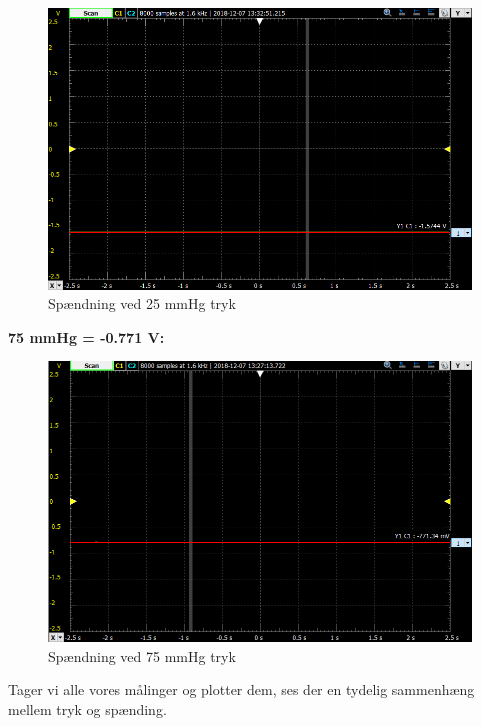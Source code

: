 \begin{figure}[h!]
	\centering
	\includegraphics[width=1\linewidth]{Hardwaredesign/mmHg25}
	\caption{Spændning ved 25 mmHg tryk}
	\label{fig:mmHg25}
\end{figure}

\vspace{0.2 cm}

\textbf{75 mmHg  =  -0.771 V:}

\vspace{0.2 cm}

\begin{figure}[h!]
	\centering
	\includegraphics[width=1\linewidth]{Hardwaredesign/mmHg75}
	\caption{Spændning ved 75 mmHg tryk}
	\label{fig:75mmHg}
\end{figure}

Tager vi alle vores målinger og plotter dem, ses der en tydelig sammenhæng mellem tryk og spænding.

